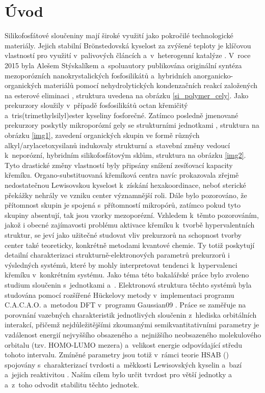 \documentclass[
  printed, %
  table,   %
  lof,     %
  lot,     %
  oneside,
]{fithesis3}
\begin{document}
\chapter{Úvod}
Silikofosfátové sloučeniny mají široké využití jako pokročilé technologické materiály. Jejich stabilní Brönstedovská kyselost za zvýšené teploty je klíčovou vlastností pro využití v~palivových článcích a~v~heterogenní katalýze \cite{korotcenkov2013handbook}\cite{Fougret2001295}. V~roce 2015 byla Alešem Stýskalíkem a~spoluautory publikována originální syntéza mezoporózních  nanokrystalických  fosfosilikátů a~hybridních anorganicko-organických materiálů pomocí nehydrolytických kondenzačních reakcí založených na esterové eliminaci \cite{1306716}, struktura uvedena na obrázku \ref{si_polymer_cely}. Jako prekurzory sloužily v~případě fosfosilikátů octan křemičitý a~tris(trimethylsilyl)ester kyseliny fosforečné. Zatímco posledně jmenované prekurzory poskytly mikroporózní gely se strukturními jednotkami , struktura na obrázku \ref{img1}, zavedení organických skupin ve formě různých alkyl/arylacetoxysilanů indukovaly strukturní  a~stavební změny vedoucí k~neporózní, hybridním silikofosfátovým sklům\cite{1316862}, struktura na obrázku \ref{img2}. Tyto drastické změny vlastností byly připsány snížení zesíťovací kapacity křemíku. Organo-substituovaná křemíková centra navíc prokazovala zřejmě nedostatečnou Lewisovskou kyselost k~získání hexakoordinace, neboť sterické překážky nehrály ve vzniku  center významnější roli. Dále bylo pozorováno, že přítomnost skupin  je spojená s~přítomností mikropórů, zatímco pokud tyto skupiny absentují, tak jsou vzorky mezoporézní.
Vzhledem k~těmto pozorováním, jakož i obecné zajímavosti problému aktivace křemíku k~tvorbě hypervalentních struktur,\cite{rendler2005hypervalent} se jeví jako užitečné studovat vliv prekurzorů na schopnost tvorby center  také teoreticky, konkrétně metodami kvantové chemie. Ty totiž poskytují detailní charakterizaci strukturně-elektronových parametrů prekurzorů i výsledných systémů, které by mohly interpretovat tendenci k~hypervalenci křemíku v~konkrétním systému. Jako téma této bakalářské práce bylo zvoleno studium sloučenin s~jednotkami  a~. Elektronová struktura těchto systémů byla studována pomocí rozšířené Hückelovy metody v~implementaci programu C.A.C.A.O. \cite{cacao} a~metodou DFT v~programu Gaussian09 \cite{g09}. Práce se zaměřuje na porovnání vazebných charakteristik jednotlivých sloučenin z~hlediska orbitálních interakcí, přičemž nejdůležitějšími zkoumanými semikvantitativními parametry je  vzdálenost energií nejvyššího obsazeného a~nejnižšího neobsazeného molekulového orbitalu (tzv. HOMO-LUMO mezera) a~velikost energie odpovídající středu tohoto intervalu. Zmíněné parametry jsou totiž v~rámci teorie HSAB () spojovány s~charakterizací tvrdosti a~měkkosti Lewisovských kyselin a~bazí a~jejich reaktivitou \cite{pearson1986absolute}. Naším cílem bylo určit tvrdost pro větší jednotky  a~ a~z~toho odvodit stabilitu těchto jednotek. 
\end{document}
